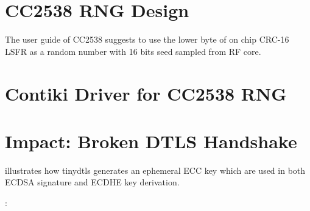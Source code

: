 \section{CC2538 RNG Design}

The user guide of CC2538 suggests to use the  lower byte of on chip CRC-16 LSFR as a random number with 16 bits seed sampled from RF core.  

\section{Contiki Driver for CC2538 RNG}

\section{Impact: Broken DTLS Handshake}

 illustrates how tinydtls generates an ephemeral ECC key which are used in both ECDSA signature and ECDHE key derivation.

: